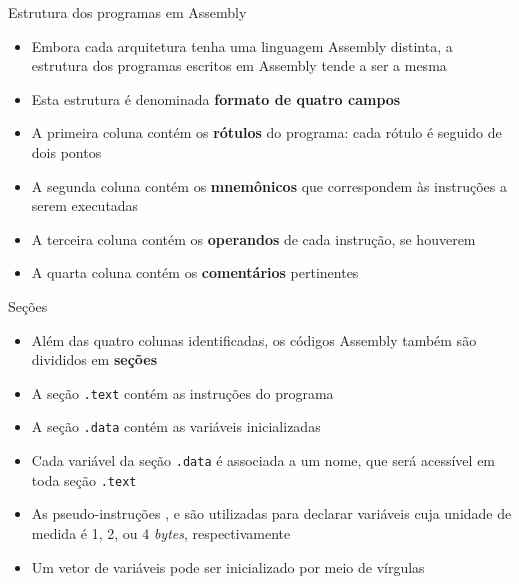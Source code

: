 \begin{frame}[fragile]{Estrutura dos programas em Assembly}

    \begin{itemize}
        \item Embora cada arquitetura tenha uma linguagem Assembly distinta, a estrutura dos 
            programas escritos em Assembly tende a ser a mesma

        \item Esta estrutura é denominada \textbf{formato de quatro campos}


        \item A primeira coluna contém os \textbf{rótulos} do programa: cada rótulo é seguido de 
            dois pontos

        \item A segunda coluna contém os \textbf{mnemônicos} que correspondem às instruções a serem
            executadas

        \item A terceira coluna contém os \textbf{operandos} de cada instrução, se houverem

        \item A quarta coluna contém os \textbf{comentários} pertinentes
    \end{itemize}

\end{frame}

\begin{frame}[fragile]{Seções}

    \begin{itemize}
        \item Além das quatro colunas identificadas, os códigos Assembly também são divididos
            em \textbf{seções}

        \item A seção \texttt{.text} contém as instruções do programa

        \item A seção \texttt{.data} contém as variáveis inicializadas

        \item Cada variável da seção \texttt{.data} é associada a um nome, que será
            acessível em toda seção \texttt{.text}

        \item As pseudo-instruções ,  e  são 
            utilizadas para declarar variáveis cuja unidade de medida é 1, 2, ou 4 \textit{bytes},
            respectivamente

        \item Um vetor de variáveis pode ser inicializado por meio de vírgulas

    \end{itemize}

\end{frame}

